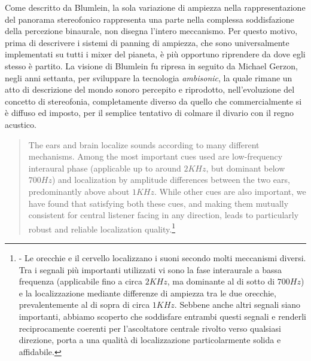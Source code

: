 Come descritto da Blumlein, la sola variazione di ampiezza nella
rappresentazione del panorama stereofonico rappresenta una parte nella complessa
soddisfazione della percezione binaurale, non disegna l'intero meccanismo.
Per questo motivo, prima di descrivere i sistemi di panning di ampiezza, che
sono universalmente implementati su tutti i mixer del pianeta, è più opportuno
riprendere da dove egli stesso è partito. La visione di Blumlein fu ripresa in
seguito da Michael Gerzon, negli anni settanta, per sviluppare la tecnologia
\emph{ambisonic}, la quale rimane un atto di descrizione del mondo sonoro
percepito e riprodotto, nell'evoluzione del concetto di stereofonia, completamente diverso
da quello che commercialmente si è diffuso ed imposto, per il semplice tentativo
di colmare il divario con il regno acustico.

\begin{quote}
The ears and brain localize sounds according to many different mechanisms. Among
the most important cues used are low-frequency interaural phase (applicable up
to around $2KHz$, but dominant below $700Hz$) and localization by
amplitude differences between the two ears, predominantly above about
$1KHz$. While other cues are also important, we have found that satisfying
both these cues, and making them mutually consistent for central listener facing
in any direction, leads to particularly robust and reliable localization
quality.\footnote{\cite{mg92pdmsss} - Le orecchie e il cervello localizzano i
suoni secondo molti meccanismi diversi. Tra i segnali più importanti utilizzati
vi sono la fase interaurale a bassa frequenza (applicabile fino a circa $2KHz$,
ma dominante al di sotto di $700Hz$) e la localizzazione mediante
differenze di ampiezza tra le due orecchie, prevalentemente al di sopra di
circa $1KHz$. Sebbene anche altri segnali siano importanti, abbiamo
scoperto che soddisfare entrambi questi segnali e renderli reciprocamente
coerenti per l'ascoltatore centrale rivolto verso qualsiasi direzione, porta
a una qualità di localizzazione particolarmente solida e affidabile.}
\end{quote}

